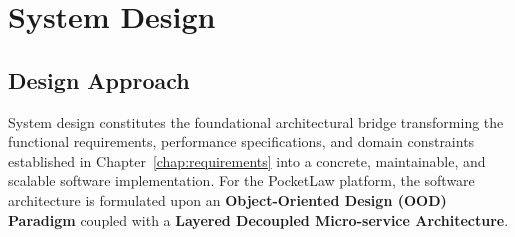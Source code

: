 \chapter{System Design}
\label{chap:system_design}

\section{Design Approach}
\label{sec:design_approach}

System design constitutes the foundational architectural bridge transforming the functional requirements, performance specifications, and domain constraints established in Chapter~\ref{chap:requirements} into a concrete, maintainable, and scalable software implementation. For the PocketLaw platform, the software architecture is formulated upon an \textbf{Object-Oriented Design (OOD) Paradigm} coupled with a \textbf{Layered Decoupled Micro-service Architecture}.

